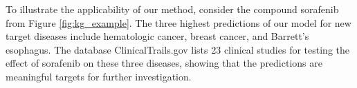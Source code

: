 \documentclass{article}
\begin{document}
To illustrate the applicability of our method, consider the compound sorafenib from Figure \ref{fig:kg_example}.
The three highest predictions of our model for new target diseases include hematologic cancer, breast cancer, and Barrett's esophagus. 
The database ClinicalTrails.gov \cite{national2007clinicaltrails} 
lists 23 clinical studies for testing the effect of sorafenib on these three diseases, showing that the predictions are meaningful targets for further investigation.  





\end{document}
